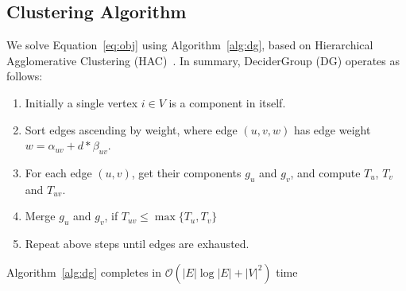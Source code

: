 \subsection{Clustering Algorithm}\label{sec:algorithm}
We solve Equation~\ref{eq:obj} using Algorithm~\ref{alg:dg},
based on Hierarchical Agglomerative Clustering (HAC)~\cite{NIPS2017_2e1b24a6}.
In summary, DeciderGroup (DG) operates as follows:
\begin{enumerate}
    \item Initially a single vertex $i \in V$ is a component in itself.
    \item Sort edges ascending by weight, where edge $(u,v,w)$ has edge weight $w = \alpha_{uv} + d * \beta_{uv}$.
    \item For each edge $(u,v)$, get their components $g_u$ and $g_v$, and compute $T_u$, $T_v$ and $T_{uv}$.
    \item Merge $g_u$ and $g_v$, if $T_{uv} \leq \max\{T_u, T_v\}$
    \item Repeat above steps until edges are exhausted.
\end{enumerate}
\begin{theorem}
    Algorithm~\ref{alg:dg} completes in $\mathcal{O}(|E|\log|E| + |V|^2)$ time
\end{theorem}
